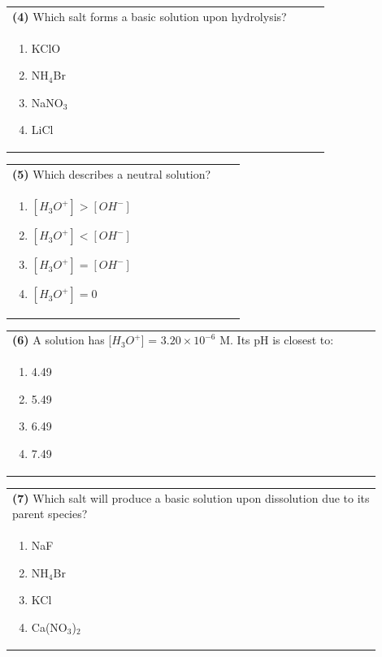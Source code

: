 \documentclass{article}
\begin{document}
\noindent\begin{tabular}{|p{0.9\linewidth}|}
\hline
\textbf{(4)} Which salt forms a basic solution upon hydrolysis? \\[0.2cm]
\begin{minipage}{0.85\linewidth}
\begin{enumerate}[label=\alph*.]
\item KClO \item NH$_4$Br \item NaNO$_3$ \item LiCl
\end{enumerate}
\end{minipage}\\[0.2cm]
\hline
\end{tabular}
\newpage

\noindent\begin{tabular}{|p{0.9\linewidth}|}
\hline
\textbf{(5)} Which describes a neutral solution? \\[0.2cm]
\begin{minipage}{0.85\linewidth}
\begin{enumerate}[label=\alph*.]
\item $[H_3O^+] > [OH^-]$
\item $[H_3O^+] < [OH^-]$
\item $[H_3O^+] = [OH^-]$
\item $[H_3O^+] = 0$
\end{enumerate}
\end{minipage}\\[0.2cm]
\hline
\end{tabular}

\noindent\begin{tabular}{|p{0.9\linewidth}|}
\hline
\textbf{(6)} A solution has [$H_3O^+$] = $3.20\times10^{-6}$ M. Its pH is closest to: \\[0.2cm]
\begin{minipage}{0.85\linewidth}
\begin{enumerate}[label=\alph*.]
\item 4.49 \item 5.49 \item 6.49 \item 7.49
\end{enumerate}
\end{minipage}\\[0.2cm]
\hline
\end{tabular}

\noindent\begin{tabular}{|p{0.9\linewidth}|}
\hline
\textbf{(7)} Which salt will produce a basic solution upon dissolution due to its parent species? \\[0.2cm]
\begin{minipage}{0.85\linewidth}
\begin{enumerate}[label=\alph*.]
\item NaF \item NH$_4$Br \item KCl \item Ca(NO$_3$)$_2$
\end{enumerate}
\end{minipage}\\[0.2cm]
\hline
\end{tabular}
\end{document}
